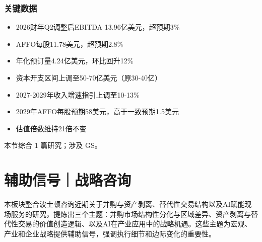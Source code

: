 \documentclass[11pt]{ctexart}
\begin{document}
\subsubsection*{关键数据}
\begin{itemize}
  \item 2026财年Q2调整后EBITDA 13.96亿美元，超预期3\%
  \item AFFO每股11.78美元，超预期2.8\%
  \item 年化预订量4.24亿美元，环比回升12\%
  \item 资本开支区间上调至50-70亿美元（原30-40亿）
  \item 2027-2029年收入增速指引上调至10-13\%
  \item 2029年AFFO每股预期58美元，高于一致预期1.5美元
  \item 估值倍数维持21倍不变
\end{itemize}
{\small\color{refgray}本节综合 1 篇研究；涉及 GS。}
\newpage
\section{辅助信号｜战略咨询}
本板块整合波士顿咨询近期关于并购与资产剥离、替代性交易结构以及AI赋能现场服务的研究，提炼出三个主题：并购市场结构性分化与区域差异、资产剥离与替代性交易的价值创造逻辑、以及AI在产业应用中的战略机遇。这些主题为宏观、产业和企业战略提供辅助信号，强调执行细节和边际变化的重要性。
\end{document}

